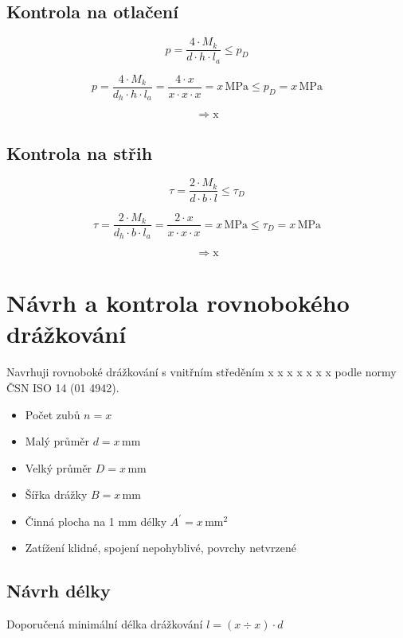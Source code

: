 \documentclass[a4paper,11pt]{article}
\newcommand{\Mk}{x} %
\newcommand{\dhr}{x} %
\newcommand{\bPera}{x} %
\newcommand{\hPera}{x} %
\newcommand{\laPera}{x} %
\newcommand{\pD}{x} %
\newcommand{\pSkut}{x} %
\newcommand{\otlacVysledek}{x} %
\newcommand{\tauD}{x} %
\newcommand{\tauSkut}{x} %
\newcommand{\strihVysledek}{x} %
\newcommand{\nDraz}{x} %
\newcommand{\dDraz}{x} %
\newcommand{\DDraz}{x} %
\newcommand{\bDraz}{x} %
\newcommand{\Adr}{x} %
\newcommand{\lKoefMinDraz}{x} %
\newcommand{\lKoefMaxDraz}{x} %
\begin{document}
\subsection{Kontrola na otlačení}

\[ p = \frac{4 \cdot M_k}{d \cdot h \cdot l_a} \leq p_D \]

\[ p = \frac{4 \cdot M_k}{d_h \cdot h \cdot l_a} = \frac{4 \cdot \Mk{}}{\dhr{} \cdot \hPera{} \cdot \laPera{}} = \pSkut{} \mathrm{\,MPa} \leq p_D = \pD{} \mathrm{\,MPa} \]

\[ \Rightarrow \mathrm{\otlacVysledek{}} \]

\subsection{Kontrola na střih}

\[ \tau = \frac{2 \cdot M_k}{d \cdot b \cdot l} \leq \tau_D \]

\[ \tau = \frac{2 \cdot M_k}{d_h \cdot b \cdot l_a} = \frac{2 \cdot \Mk{}}{\dhr{} \cdot \bPera{} \cdot \laPera{}} = \tauSkut{} \mathrm{\,MPa} \leq \tau_D  = \tauD{} \mathrm{\,MPa} \]

\[ \Rightarrow \mathrm{\strihVysledek{}} \]

\section{Návrh a kontrola rovnobokého drážkování}

Navrhuji rovnoboké drážkování s vnitřním středěním \nDraz{} x \dDraz{} x \DDraz{} x \bDraz{} podle normy ČSN ISO 14 (01 4942).
\begin{itemize}
\item Počet zubů $n = \nDraz{}$
\item Malý průměr $d = \dDraz{} \mathrm{\,mm}$
\item Velký průměr $D = \DDraz{} \mathrm{\,mm}$
\item Šířka drážky $B = \bDraz{} \mathrm{\,mm}$
\item Činná plocha na 1 mm délky $A^{'} = \Adr{} \mathrm{\,mm}^2$
\item Zatížení klidné, spojení nepohyblivé, povrchy netvrzené
\end{itemize}

\subsection{Návrh délky}

Doporučená minimální délka drážkování $l = (\lKoefMinDraz{} \div \lKoefMaxDraz{}) \cdot d$
\end{document}
